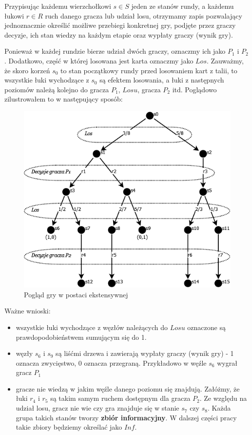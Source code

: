 Przypisując każdemu wierzchołkowi $s \in S$ jeden ze stanów rundy, a każdemu łukowi $r \in R$ ruch danego gracza lub udział losu, otrzymamy zapis pozwalający jednoznacznie określić możliwe przebiegi konkretnej gry, podjęte przez graczy decyzje, ich stan wiedzy na każdym etapie oraz wypłaty graczy (wynik gry).

Ponieważ w każdej rundzie bierze udział dwóch graczy, oznaczmy ich jako $P_1$ i $P_2$. Dodatkowo, część w której losowana jest karta oznaczmy jako $Los$. Zauważmy, że skoro korzeń $s_0$ to stan początkowy rundy przed losowaniem kart z talii, to wszystkie łuki wychodzące z $s_0$ są efektem losowania, a łuki z następnych poziomów należą kolejno do gracza $P_1$, $Losu$, gracza $P_2$ itd. Poglądowo zilustrowałem to w następujący sposób:

\clearpage
\begin{figure}[h]
	\centering
	\includegraphics[scale=0.5]{Resources/drzewo.png}
	\caption{Pogląd gry w postaci ekstensywnej} \label{fig:drzewo}
\end{figure}
Ważne wnioski:
\begin{itemize}
	\item wszystkie łuki wychodzące z węzłów należących do $Losu$ oznaczone są prawdopodobieństwem sumującym się do 1.
	\item węzły $s_6$ i $s_9$ są liśćmi drzewa i zawierają wypłaty graczy (wynik gry) - 1 oznacza zwycięstwo, 0 oznacza przegraną. Przykładowo w węźle $s_6$ wygrał gracz $P_1$
	\item gracze nie wiedzą w jakim węźle danego poziomu się znajdują. Załóżmy, że łuki $r_4$ i $r_5$ są takim samym ruchem dostępnym dla gracza $P_2$. Ze względu na udział losu, gracz nie wie czy gra znajduje się w stanie $s_7$ czy $s_8$. Każda grupa takich stanów tworzy \textbf{zbiór informacyjny}. W dalszej części pracy takie zbiory będziemy określać jako $Inf$.
\end{itemize}

